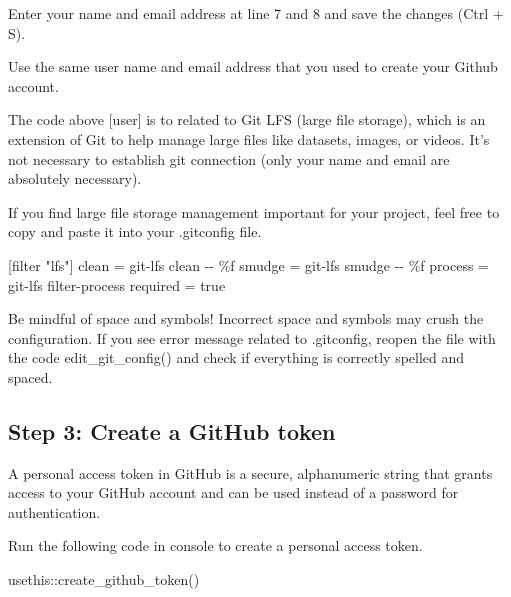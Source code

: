 \documentclass[
  letterpaper,
  DIV=11,
  numbers=noendperiod]{scrartcl}
\newenvironment{Shaded}{\begin{snugshade}}{\end{snugshade}}
\newcommand{\FunctionTok}[1]{\textcolor[rgb]{0.28,0.35,0.67}{#1}}
\newcommand{\NormalTok}[1]{\textcolor[rgb]{0.00,0.23,0.31}{#1}}
\newcommand{\OtherTok}[1]{\textcolor[rgb]{0.00,0.23,0.31}{#1}}
\newcommand{\SpecialCharTok}[1]{\textcolor[rgb]{0.37,0.37,0.37}{#1}}
\newcommand{\StringTok}[1]{\textcolor[rgb]{0.13,0.47,0.30}{#1}}
\begin{document}
Enter your name and email address at line 7 and 8 and save the changes
(Ctrl + S).

Use the same user name and email address that you used to create your
Github account.

The code above {[}user{]} is to related to Git LFS (large file storage),
which is an extension of Git to help manage large files like datasets,
images, or videos. It's not necessary to establish git connection (only
your name and email are absolutely necessary).

If you find large file storage management important for your project,
feel free to copy and paste it into your .gitconfig file.

\begin{Shaded}
\begin{Highlighting}[]
\NormalTok{[filter }\StringTok{"lfs"}\NormalTok{]}
\NormalTok{  clean }\OtherTok{=}\NormalTok{ git}\SpecialCharTok{{-}}\NormalTok{lfs clean }\SpecialCharTok{{-}{-}}\NormalTok{ \%f}
\NormalTok{  smudge }\OtherTok{=}\NormalTok{ git}\SpecialCharTok{{-}}\NormalTok{lfs smudge }\SpecialCharTok{{-}{-}}\NormalTok{ \%f}
\NormalTok{  process }\OtherTok{=}\NormalTok{ git}\SpecialCharTok{{-}}\NormalTok{lfs filter}\SpecialCharTok{{-}}\NormalTok{process}
\NormalTok{  required }\OtherTok{=}\NormalTok{ true}
\end{Highlighting}
\end{Shaded}

Be mindful of space and symbols! Incorrect space and symbols may crush
the configuration. If you see error message related to .gitconfig,
reopen the file with the code edit\_git\_config() and check if
everything is correctly spelled and spaced.

\subsection{Step 3: Create a GitHub
token}\label{step-3-create-a-github-token}

A personal access token in GitHub is a secure, alphanumeric string that
grants access to your GitHub account and can be used instead of a
password for authentication.

Run the following code in console to create a personal access token.

\begin{Shaded}
\begin{Highlighting}[]
\NormalTok{usethis}\SpecialCharTok{::}\FunctionTok{create\_github\_token}\NormalTok{()}
\end{Highlighting}
\end{Shaded}
\end{document}
